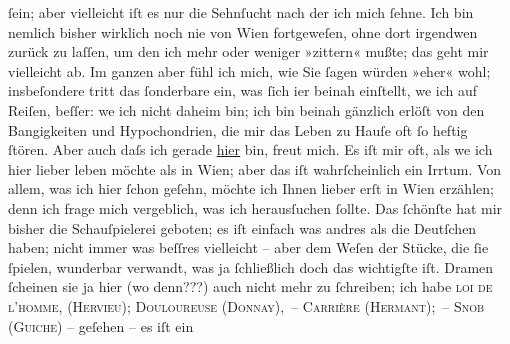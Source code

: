 \begin{ledgroupsized}[t]{13cm}
                    ſein; aber vielleicht iſt {\pb}es nur die Sehnſucht nach
                    der ich mich ſehne. Ich bin nemlich bisher wirklich noch nie von Wien fortgeweſen, ohne dort irgendwen zurück zu laſſen, um
                    den ich mehr oder weniger »zittern« mußte; das geht mir vielleicht ab. Im ganzen
                    aber fühl ich mich, wie Sie ſagen würden »eher« wohl; insbeſondere tritt das
                    ſonderbare ein, was ſich i{\geminationm}er beinah einſtellt,
                    we{\geminationn} ich auf Reiſen, beſſer: we{\geminationn} ich nicht daheim
                    bin; ich bin beinah gänzlich erlöſt von den Bangigkeiten und Hypochondrien, die
                    mir das Leben zu Hauſe oft ſo heftig ſtören. Aber \introOben{}auch\introOben{}
                    daſs ich gerade \uline{hier} bin, freut mich. Es iſt mir
                    oft, als we{\geminationn} ich hier lieber leben möchte als in Wien; aber das iſt wahrſchein{\pb}lich ein
                    Irrtum. Von allem, was ich hier ſchon geſehn, möchte ich Ihnen lieber erſt in
                        Wien erzählen; denn ich frage mich
                    vergeblich, was ich herausſuchen ſollte. Das ſchönſte hat mir bisher die
                    Schauſpielerei geboten; es iſt einfach was andres als die Deutſchen haben; nicht
                    immer was beſſres vielleicht – aber dem Weſen der Stücke, die ſie ſpielen,
                    wunderbar verwandt, was ja ſchließlich doch das wichtigſte iſt. Dramen ſcheinen
                    sie ja hier (wo denn???) auch nicht mehr zu ſchreiben; ich habe \textsc{loi de l’homme, (Hervieu); Douloureuse (Donnay), – Carrière (Hermant); – Snob (Guiche)} – geſehen – es iſt ein

\end{ledgroupsized}
